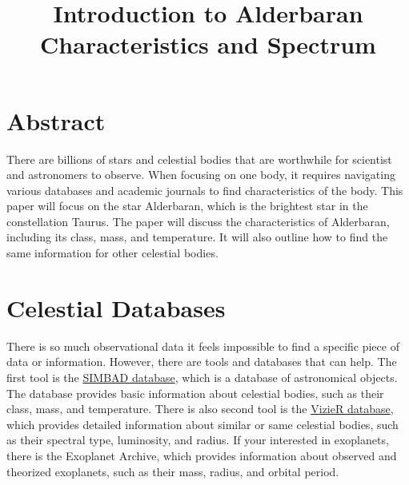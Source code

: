 \documentclass[12pt,oneside,a4paper,english]{article}
\title{Introduction to Alderbaran Characteristics and Spectrum} %
\begin{document}

\doublespacing
\renewcommand{\baselinestretch}{1}\normalsize
\tableofcontents
\renewcommand{\baselinestretch}{1}\normalsize
\thispagestyle{fancy} %
\newpage
\section{Abstract}
There are billions of stars and celestial bodies that are worthwhile for scientist and astronomers to observe. When focusing on one body, it requires navigating various databases and academic journals to find characteristics of the body. This paper will focus on the star Alderbaran, which is the brightest star in the constellation Taurus. The paper will discuss the characteristics of Alderbaran, including its class, mass, and temperature. It will also outline how to find the same information for other celestial bodies. 

\section{Celestial Databases}
There is so much observational data it feels impossible to find a specific piece of data or information. However, there are tools and databases that can help. The first tool is the \href{https://cds.unistra.fr/}{SIMBAD database}, which is a database of astronomical objects. The database provides basic information about celestial bodies, such as their class, mass, and temperature. There is also second tool is the \href{https://vizier.cds.unistra.fr/viz-bin/VizieR}{VizieR database}, which provides detailed information about similar or same celestial bodies, such as their spectral type, luminosity, and radius. If your interested in exoplanets, there is the Exoplanet Archive, which provides information about observed and theorized exoplanets, such as their mass, radius, and orbital period.
\end{document}
